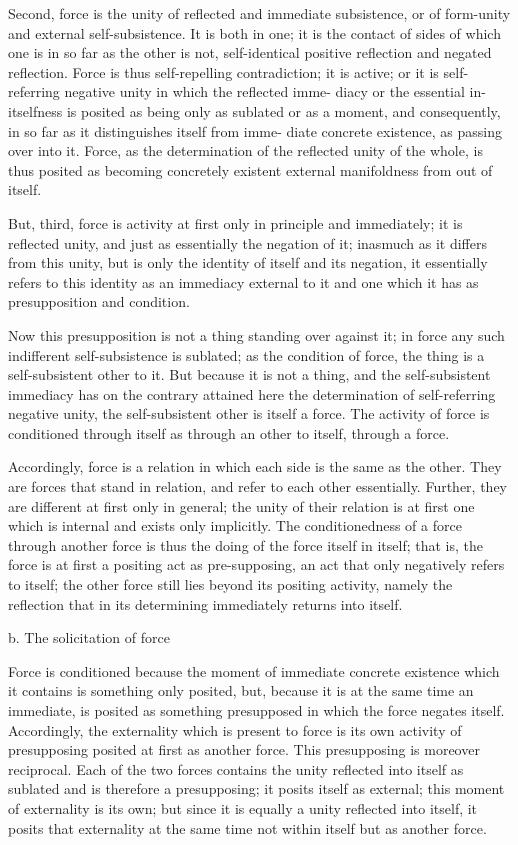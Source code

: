 Second, force is the unity of reflected and immediate subsistence, or of
form-unity and external self-subsistence. It is both in one; it is the contact
of sides of which one is in so far as the other is not, self-identical positive
reflection and negated reflection. Force is thus self-repelling contradiction;
it is active; or it is self-referring negative unity in which the reflected imme-
diacy or the essential in-itselfness is posited as being only as sublated or as
a moment, and consequently, in so far as it distinguishes itself from imme-
diate concrete existence, as passing over into it. Force, as the determination
of the reflected unity of the whole, is thus posited as becoming concretely
existent external manifoldness from out of itself.

But, third, force is activity at first only in principle and immediately; it
is reflected unity, and just as essentially the negation of it; inasmuch as it
differs from this unity, but is only the identity of itself and its negation,
it essentially refers to this identity as an immediacy external to it and one
which it has as presupposition and condition.

Now this presupposition is not a thing standing over against it; in
force any such indifferent self-subsistence is sublated; as the condition of
force, the thing is a self-subsistent other to it. But because it is not a thing,
and the self-subsistent immediacy has on the contrary attained here the
determination of self-referring negative unity, the self-subsistent other is itself
a force.
The activity of force is conditioned through itself as through an
other to itself, through a force.

Accordingly, force is a relation in which each side is the same as the other.
They are forces that stand in relation, and refer to each other essentially.
Further, they are different at first only in general; the unity of their relation
is at first one which is internal and exists only implicitly. The conditionedness
of a force through another force is thus the doing of the force itself in itself;
that is, the force is at first a positing act as pre-supposing, an act that
only negatively refers to itself; the other force still lies beyond its positing
activity, namely the reflection that in its determining immediately returns
into itself.

b. The solicitation of force

Force is conditioned because the moment of immediate concrete existence
which it contains is something only posited, but, because it is at the same
time an immediate, is posited as something presupposed in which the force
negates itself. Accordingly, the externality which is present to force is its
own activity of presupposing posited at first as another force.
This presupposing is moreover reciprocal. Each of the two forces contains
the unity reflected into itself as sublated and is therefore a presupposing; it
posits itself as external; this moment of externality is its own; but since it
is equally a unity reflected into itself, it posits that externality at the same
time not within itself but as another force.

